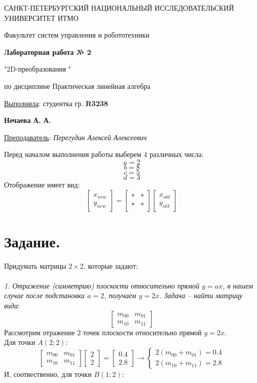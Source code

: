 \documentclass[a5paper, 10pt]{article}
\theoremstyle{definition}
\theoremstyle{plain}
\theoremstyle{remark}
\newcommand*{\titlePage}{
	\thispagestyle{title}
	\begingroup
	\begin{center}
		\vspace*{6ex}
		
		{\small
			САНКТ-ПЕТЕРБУРГСКИЙ НАЦИОНАЛЬНЫЙ ИССЛЕДОВАТЕЛЬСКИЙ УНИВЕРСИТЕТ ИТМО	
		}
		
		\vspace*{2ex}
		
		{\normalsize
			Факультет систем управления и робототехники
		}
		
		\vspace*{15ex}
		
		{\Large \bfseries 
			Лабораторная работа № 2
		}
\vspace*{2ex}
	{\Large \bfseries 
			
"2D-преобразования "
		}
\vspace*{2ex}
		
		{\normalsize
			по дисциплине Практическая линейная алгебра
		}

	\end{center}
	\vspace*{20ex}
	\begin{flushright}
		{\large 
			\underline{Выполнила}: студентка гр. \textbf{R3238}\\
			\begin{flushright}
				\textbf{Нечаева А. А.}\\
			\end{flushright}
		}
		
		\vspace*{5ex}
		
		{\large 
			\underline{Преподаватель}: \textit{Перегудин Алексей Алексеевич}
		}
	\end{flushright}	
	\newpage
	\setcounter{page}{1}
	\endgroup}
\begin{document}
	\titlePage
	\pagestyle{style}
\newpage

Перед началом выполнения работы выберем 4 различных числа: $$a = 2$$ $$b = 8$$ $$c = 5$$ $$d=3$$
Отображение имеет вид:
\begin{equation}
\begin{bmatrix}
x_{new}\\
y_{new}
\end{bmatrix}
=
\begin{bmatrix}
* & *\\
* & *
\end{bmatrix}
\begin{bmatrix}
x_{old}\\
y_{old}
\end{bmatrix}
\end{equation}


\section{Задание.}
 Придумать матрицы $2 \times 2$, которые задают:\\\\
\textit{1. Отражение (симметрию) плоскости относительно прямой $y=ax$, в нашем случае после подстановки $a=2$, получаем $y=2x$. Задача -- найти матрицу вида}:
\begin{equation}
\begin{bmatrix}
m_{0 0} & m_{0 1}\\
m_{1 0} & m_{1 1}
\end{bmatrix}
\end{equation}
Рассмотрим отражение 2 точек плоскости относительно прямой  $y=2x$.\\
Для точки $A (2; 2)$:
\begin{equation}
\begin{bmatrix}
m_{0 0} & m_{0 1}\\
m_{1 0} & m_{1 1}
\end{bmatrix}
\begin{bmatrix}
2\\
2
\end{bmatrix}
=
\begin{bmatrix}
0.4\\
2.8
\end{bmatrix}
\to
\begin{cases}
2(m_{0 0} +  m_{0 1}) = 0.4\\
2(m_{1 0} + m_{1 1}) = 2.8
\end{cases}
\end{equation}
И, соотвественно, для точки $B(1;2)$:
\end{document}
